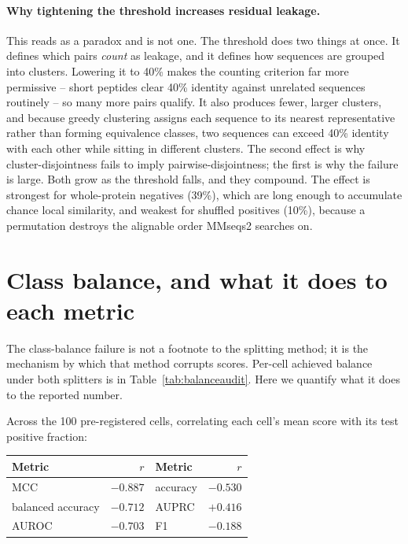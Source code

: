 \documentclass[11pt,a4paper]{article}
\begin{document}
\paragraph{Why tightening the threshold increases residual leakage.} This reads as a
paradox and is not one. The threshold does two things at once. It defines which pairs
\emph{count} as leakage, and it defines how sequences are grouped into clusters. Lowering it
to 40\% makes the counting criterion far more permissive -- short peptides clear 40\%
identity against unrelated sequences routinely -- so many more pairs qualify. It also
produces fewer, larger clusters, and because greedy clustering assigns each sequence to its
nearest representative rather than forming equivalence classes, two sequences can exceed
40\% identity with each other while sitting in different clusters. The second effect is why
cluster-disjointness fails to imply pairwise-disjointness; the first is why the failure is
large. Both grow as the threshold falls, and they compound. The effect is strongest for
whole-protein negatives (39\%), which are long enough to accumulate chance local
similarity, and weakest for shuffled positives (10\%), because a permutation destroys the
alignable order MMseqs2 searches on.

\section{Class balance, and what it does to each metric}
\label{sec:balmetric}

The class-balance failure is not a footnote to the splitting method; it is the mechanism by
which that method corrupts scores. Per-cell achieved balance under both splitters is in
Table~\ref{tab:balanceaudit}. Here we quantify what it does to the reported number.

Across the 100 pre-registered cells, correlating each cell's mean score with its test
positive fraction:

\begin{center}\small
\begin{tabular}{lrlr}
\toprule
Metric & $r$ & Metric & $r$ \\
\midrule
MCC               & $\mathbf{-0.887}$ & accuracy & $-0.530$ \\
balanced accuracy & $-0.712$          & AUPRC    & $+0.416$ \\
AUROC             & $-0.703$          & F1       & $-0.188$ \\
\bottomrule
\end{tabular}
\end{center}
\end{document}
